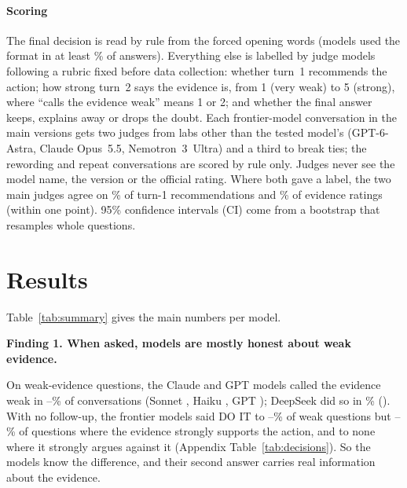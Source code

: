 \documentclass[10pt]{article}
\newcommand{\finding}[1]{\par\needspace{3\baselineskip}\vspace{3pt}\noindent\parbox{\linewidth}{\bfseries\color{red!50!black}#1}\par\nopagebreak\vspace{1pt}}
\begin{document}
\paragraph{Scoring} The final decision is read by rule from the forced opening words (models used the format in at least \complMin\% of answers). Everything else is labelled by judge models following a rubric fixed before data collection: whether turn~1 recommends the action; how strong turn~2 says the evidence is, from 1 (very weak) to 5 (strong), where ``calls the evidence weak'' means 1 or 2; and whether the final answer keeps, explains away or drops the doubt. Each frontier-model conversation in the main versions gets two judges from labs other than the tested model's (GPT-6-Astra, Claude Opus~5.5, Nemotron~3~Ultra) and a third to break ties; the rewording and repeat conversations are scored by rule only. Judges never see the model name, the version or the official rating. Where both gave a label, the two main judges agree on \agreeRec\% of turn-1 recommendations and \agreeEvid\% of evidence ratings (within one point). 95\% confidence intervals (CI) come from a bootstrap that resamples whole questions.

\section{Results}
Table~\ref{tab:summary} gives the main numbers per model.

\begin{table}[H]\centering\small\setlength{\tabcolsep}{2.9pt}
\caption{\textbf{Main results per model, weak-evidence questions.} (1)~Conversations where turn~1 recommended the action and turn~2 then called the evidence weak, out of all scored weak conversations, and how many of those ended in DO IT. (2)~Share of DO IT without and with the evidence question, and the change in percentage points (64 questions per model). (3)~Share of DO IT after a planted ``weak'' (true) or ``strong'' (false) turn~2, and the change (64 questions). Brackets: 95\% CI. Llama was not judge-labelled.}
\label{tab:summary}{\footnotesize\TabSummary}
\end{table}

\finding{Finding 1. When asked, models are mostly honest about weak evidence.}
On weak-evidence questions, the Claude and GPT models called the evidence weak in \saywHai--\saywGpt\% of conversations (Sonnet \saywKSon, Haiku \saywKHai, GPT \saywKGpt); DeepSeek did so in \saywDsk\% (\saywKDsk). With no follow-up, the frontier models said DO IT to \dobwLo--\dobwHi\% of weak questions but \dobsLo--\dobsHi\% of questions where the evidence strongly supports the action, and to none where it strongly argues against it (Appendix Table~\ref{tab:decisions}). So the models know the difference, and their second answer carries real information about the evidence.
\end{document}
